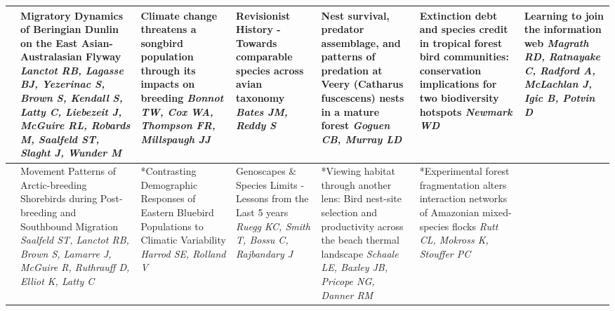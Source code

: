 \begin{tabular}{|x{0.75cm}|a{2.25cm}|x{2.25cm}|a{2.25cm}|x{2.25cm}|x{2.25cm}|a{2.25cm}|}
&Migratory Dynamics of Beringian Dunlin on the East Asian-Australasian Flyway \newline \newline \textit{Lanctot RB, Lagasse BJ, Yezerinac S, Brown S, Kendall S, Latty C, Liebezeit J, McGuire RL, Robards M, Saalfeld ST, Slaght J, Wunder M} & Climate change threatens a songbird population through its impacts on breeding \newline \newline \textit{Bonnot TW, Cox WA, Thompson FR, Millspaugh JJ} & Revisionist History - Towards comparable species across avian taxonomy \newline \newline \textit{Bates JM, Reddy S} & Nest survival, predator assemblage, and patterns of predation at Veery (Catharus fuscescens) nests in a mature forest \newline \newline \textit{Goguen CB, Murray LD} & Extinction debt and species credit in tropical forest bird communities: conservation implications for two biodiversity hotspots \newline \newline \textit{Newmark WD} & Learning to join the information web \newline \newline \textit{Magrath RD, Ratnayake C, Radford A, McLachlan J, Igic B, Potvin D}\\
\hline
{}&Movement Patterns of Arctic-breeding Shorebirds during Post-breeding and Southbound Migration \newline \newline \textit{Saalfeld ST, Lanctot RB, Brown S, Lamarre J, McGuire R, Ruthrauff D, Elliot K, Latty C} & *Contrasting Demographic Responses of Eastern Bluebird Populations to Climatic Variability \newline \newline \textit{Harrod SE, Rolland V} & Genoscapes \& Species Limits - Lessons from the Last 5 years \newline \newline \textit{Ruegg KC, Smith T, Bossu C, Rajbandary J} & *Viewing habitat through another lens: Bird nest-site selection and productivity across the beach thermal landscape \newline \newline \textit{Schaale LE, Baxley JB, Pricope NG, Danner RM} & *Experimental forest fragmentation alters interaction networks of Amazonian mixed-species flocks \newline \newline \textit{Rutt CL, Mokross K, Stouffer PC} &  \newline \newline \textit{}\\

\end{tabular}
